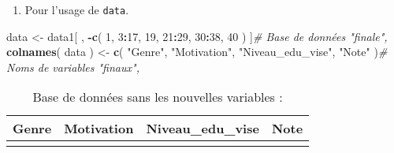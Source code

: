\documentclass[
  11pt,
  french,
]{article}
\newenvironment{Shaded}{\begin{snugshade}}{\end{snugshade}}
\newcommand{\CommentTok}[1]{\textcolor[rgb]{0.56,0.35,0.01}{\textit{#1}}}
\newcommand{\DecValTok}[1]{\textcolor[rgb]{0.00,0.00,0.81}{#1}}
\newcommand{\KeywordTok}[1]{\textcolor[rgb]{0.13,0.29,0.53}{\textbf{#1}}}
\newcommand{\NormalTok}[1]{#1}
\newcommand{\OperatorTok}[1]{\textcolor[rgb]{0.81,0.36,0.00}{\textbf{#1}}}
\newcommand{\StringTok}[1]{\textcolor[rgb]{0.31,0.60,0.02}{#1}}
\providecommand{\tightlist}{%
  \setlength{\itemsep}{0pt}\setlength{\parskip}{0pt}}
\begin{document}
\begin{enumerate}
\def\labelenumi{\arabic{enumi}.}
\setcounter{enumi}{1}
\tightlist
\item
  Pour l'usage de \texttt{data}.
\end{enumerate}

\begin{Shaded}
\begin{Highlighting}[]
\NormalTok{data <-}\StringTok{ }\NormalTok{data1[ , }\OperatorTok{-}\KeywordTok{c}\NormalTok{( }\DecValTok{1}\NormalTok{,}
                     \DecValTok{3}\OperatorTok{:}\DecValTok{17}\NormalTok{,}
                     \DecValTok{19}\NormalTok{,}
                     \DecValTok{21}\OperatorTok{:}\DecValTok{29}\NormalTok{,}
                     \DecValTok{30}\OperatorTok{:}\DecValTok{38}\NormalTok{,}
                     \DecValTok{40}\NormalTok{ ) ]}\CommentTok{# Base de données "finale",}
\KeywordTok{colnames}\NormalTok{( data ) <-}\StringTok{ }\KeywordTok{c}\NormalTok{( }\StringTok{"Genre"}\NormalTok{,}
                       \StringTok{"Motivation"}\NormalTok{,}
                       \StringTok{"Niveau_edu_vise"}\NormalTok{,}
                       \StringTok{"Note"}\NormalTok{ )}\CommentTok{# Noms de variables "finaux",}
\end{Highlighting}
\end{Shaded}

\begin{table}[!h]

\caption{\label{tab:table1}Base de données sans les nouvelles variables :}
\centering
\begin{tabular}[t]{lrlr}
\toprule
Genre & Motivation & Niveau\_edu\_vise & Note\\
\midrule
\cellcolor{gray!6}{Homme} & \cellcolor{gray!6}{8} & \cellcolor{gray!6}{BAC+5 ET +} & \cellcolor{gray!6}{15.53}\\
\bottomrule
\end{tabular}
\end{table}

\begin{table}[!h]

\caption{\label{tab:table2}Base de données avec les nouvelles variables :}
\centering
{}
\end{table}
\end{document}
